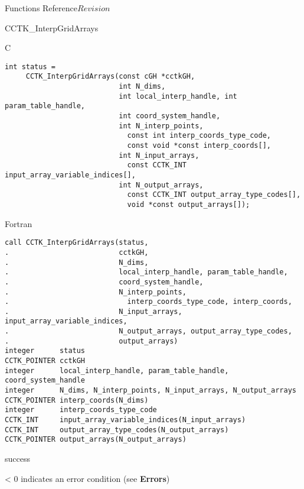 \begin{cactuspart}{ Functions Reference}{}{$Revision$}
\begin{FunctionDescription}{CCTK\_InterpGridArrays}
\begin{SynopsisSection}
\begin{Synopsis}{C}
\begin{verbatim}
int status =
     CCTK_InterpGridArrays(const cGH *cctkGH,
                           int N_dims,
                           int local_interp_handle, int param_table_handle,
                           int coord_system_handle,
                           int N_interp_points,
                             const int interp_coords_type_code,
                             const void *const interp_coords[],
                           int N_input_arrays,
                             const CCTK_INT input_array_variable_indices[],
                           int N_output_arrays,
                             const CCTK_INT output_array_type_codes[],
                             void *const output_arrays[]);
\end{verbatim}
\end{Synopsis}
\begin{Synopsis}{Fortran}
\begin{verbatim}
call CCTK_InterpGridArrays(status,
.                          cctkGH,
.                          N_dims,
.                          local_interp_handle, param_table_handle,
.                          coord_system_handle,
.                          N_interp_points,
.                            interp_coords_type_code, interp_coords,
.                          N_input_arrays, input_array_variable_indices,
.                          N_output_arrays, output_array_type_codes,
.                          output_arrays)
integer      status
CCTK_POINTER cctkGH
integer      local_interp_handle, param_table_handle, coord_system_handle
integer      N_dims, N_interp_points, N_input_arrays, N_output_arrays
CCTK_POINTER interp_coords(N_dims)
integer      interp_coords_type_code
CCTK_INT     input_array_variable_indices(N_input_arrays)
CCTK_INT     output_array_type_codes(N_output_arrays)
CCTK_POINTER output_arrays(N_output_arrays)
\end{verbatim}
\end{Synopsis}
\end{SynopsisSection}

\begin{ResultSection}
\begin{Result}{0} success \end{Result}
\begin{Result}{< 0} indicates an error condition (see {\bf Errors}) \end{Result}
\end{ResultSection}


\end{FunctionDescription}
\end{cactuspart}
